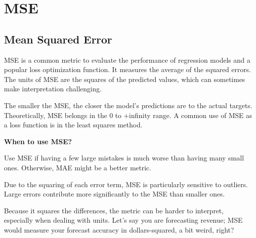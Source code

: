 \clearpage
\thispagestyle{regressionstyle}
\section{MSE}
\subsection{Mean Squared Error}

MSE is a common metric to evaluate the performance of regression models and a popular loss optimization function. It measures the average of the squared errors.
The units of MSE are the squares of the predicted values, which can sometimes make interpretation challenging.

\begin{center}
\end{center}

The smaller the MSE, the closer the model's predictions are to the actual targets. Theoretically, MSE belongs in the 0 to +infinity range.
A common use of MSE as a loss function is in the least squares method.

\textbf{When to use MSE?}

Use MSE if having a few large mistakes is much worse than having many small ones. Otherwise, MAE might be a better metric.

{
    \item Due to the squaring of each error term, MSE is particularly sensitive to outliers. Large errors contribute more significantly to the MSE than smaller ones.
    \item Because it squares the differences, the metric can be harder to interpret, especially when dealing with units.
    Let's say you are forecasting revenue; MSE would measure your forecast accuracy in dollars-squared, a bit weird, right?
}

